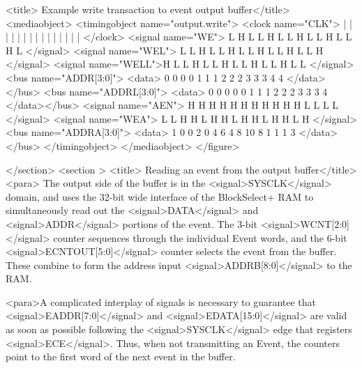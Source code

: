         
          <title> Example write transaction to event output buffer</title>
          <mediaobject>
            <timingobject name="output.write">
              <clock name="CLK">  | |  |  |  |  |  |  |  |  |  |  |  |  |  |  
              </clock>
              <signal name="WE">  L H  L  L  H  L  L  H  L  L  H  L  L  H  L
              </signal>
              <signal name="WEL"> L L  H  L  L  H  L  L  H  L  L  H  L  L  H
              </signal>
              <signal name="WELL">H L  L  H  L  L  H  L  L  H  L  L  H  L  L
              </signal>
              <bus name="ADDR[3:0]">
                <data>            0 0  0  0  1  1  1  2  2  2  3  3  3  4  4
                </data></bus>
              <bus name="ADDRL[3:0]">
                <data>            0 0  0  0  0  1  1  1  2  2  2  3  3  3  4                </data></bus>
              <signal name="AEN"> H H  H  H  H  H  H  H  H  H  H  L  L  L  L 
                </signal>
              <signal name="WEA"> L L  H  H  L  H  H  L  H  H  L  H  H  L  H
                </signal>
              <bus name="ADDRA[3:0]">
                <data>            1 0  0  2  0  4  6  4  8  10 8  1  1  1  3
                </data> </bus>
            </timingobject>
          </mediaobject>
        </figure>
                  
                
      </section>
      <section >
        <title> Reading an event from the output buffer</title>
        <para> The output side of the buffer is in the
        <signal>SYSCLK</signal> domain, and uses the 32-bit wide
        interface of the BlockSelect+ RAM to simultaneously read out
        the <signal>DATA</signal> and <signal>ADDR</signal> portions
        of the event. The 3-bit <signal>WCNT[2:0]</signal> counter
        sequences through the individual Event words, and the 6-bit
        <signal>ECNTOUT[5:0]</signal> counter selects the event from
        the buffer. These combine to form the address input
        <signal>ADDRB[8:0]</signal> to the RAM.  
   
        <para>A complicated interplay of signals is necessary to
        guarantee that <signal>EADDR[7:0]</signal> and
        <signal>EDATA[15:0]</signal> are valid as soon as possible
        following the <signal>SYSCLK</signal> edge that registers
        <signal>ECE</signal>. Thus, when not transmitting an Event,
        the counters point to the first word of the next event in the
        buffer. 

